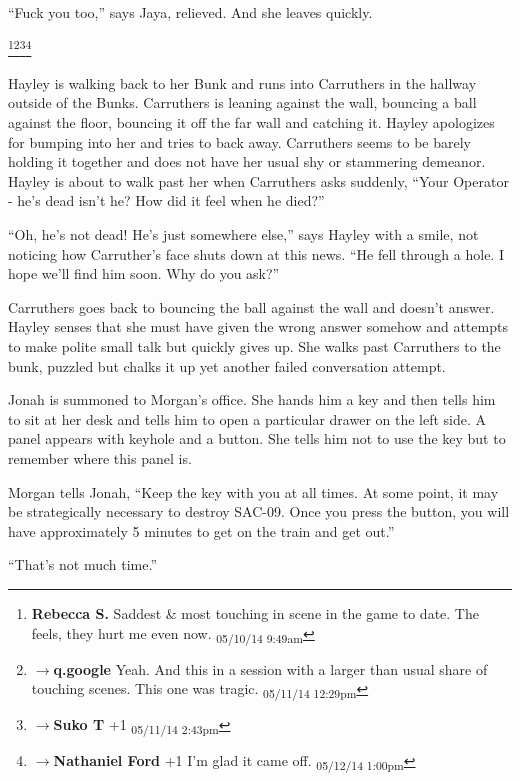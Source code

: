 ``Fuck you too,'' says Jaya, relieved.  And she leaves quickly.


\footnote{\textbf{Rebecca S. }Saddest \& most touching in scene in the game to date.  The feels, they hurt me even now. \textsubscript{05/10/14 9:49am}}\footnote{$\rightarrow$\textbf{q.google }Yeah.  And this in a session with a larger than usual share of touching scenes.  This one was tragic. \textsubscript{05/11/14 12:29pm}}\footnote{$\rightarrow$\textbf{Suko T }+1 \textsubscript{05/11/14 2:43pm}}\footnote{$\rightarrow$\textbf{Nathaniel Ford }+1 I'm glad it came off. \textsubscript{05/12/14 1:00pm}}

Hayley is walking back to her Bunk and runs into Carruthers in the hallway outside of the Bunks.  Carruthers is leaning against the wall, bouncing a ball against the floor, bouncing it off the far wall and catching it.  Hayley apologizes for bumping into her and tries to back away.  Carruthers seems to be barely holding it together and does not have her usual shy or stammering demeanor.  Hayley is about to walk past her when Carruthers asks suddenly, ``Your Operator - he's dead isn't he?  How did it feel when he died?''

``Oh, he's not dead!  He's just somewhere else,'' says Hayley with a smile, not noticing how Carruther's face shuts down at this news.  ``He fell through a hole.  I hope we'll find him soon.  Why do you ask?''

Carruthers goes back to bouncing the ball against the wall and doesn't answer.  Hayley senses that she must have given the wrong answer somehow and attempts to make polite small talk but quickly gives up.  She walks past Carruthers to the bunk, puzzled but chalks it up yet another failed conversation attempt.



Jonah is summoned to Morgan's office.  She hands him a key and then tells him to sit at her desk and tells him to open a particular drawer on the left side.  A panel appears with keyhole and a button.  She tells him not to use the key but to remember where this panel is.

Morgan tells Jonah, ``Keep the key with you at all times.  At some point, it may be strategically necessary to destroy SAC-09.  Once you press the button, you will have approximately 5 minutes to get on the train and get out.''

``That's not much time.''

